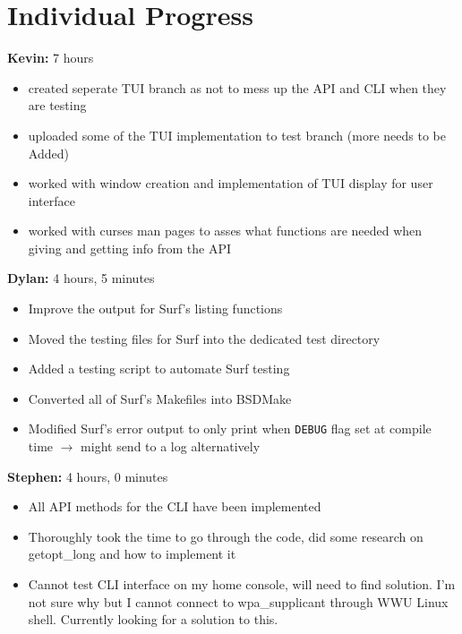\documentclass[11pt]{article}
\begin{document}
\newpage
\section{Individual Progress}

\textbf{Kevin:} 7 hours
\begin{itemize}
  \item created seperate TUI branch as not to mess up the API and CLI when they are testing
  \item uploaded some of the TUI implementation to test branch (more needs to be Added)
  \item worked with window creation and implementation of TUI display for user interface
  \item worked with curses man pages to asses what functions are needed when giving and getting info from the API
\end{itemize}

\textbf{Dylan:} 4 hours, 5 minutes
\begin{itemize}
  \item Improve the output for Surf's listing functions
  \item Moved the testing files for Surf into the dedicated test directory
  \item Added a testing script to automate Surf testing
  \item Converted all of Surf's Makefiles into BSDMake
  \item Modified Surf's error output to only print when \texttt{DEBUG} flag set
    at compile time $\rightarrow$ might send to a log alternatively
\end{itemize}

\textbf{Stephen:} 4 hours, 0 minutes 
\begin{itemize}
  \item All API methods for the CLI have been implemented 
  \item Thoroughly took the time to go through the code, did some research on getopt_long
	and how to implement it
  \item Cannot test CLI interface on my home console, will need to find solution. I'm not 
	sure why but I cannot connect to wpa_supplicant through WWU Linux shell. Currently 
	looking for a solution to this. 
\end{itemize}
\end{document}

